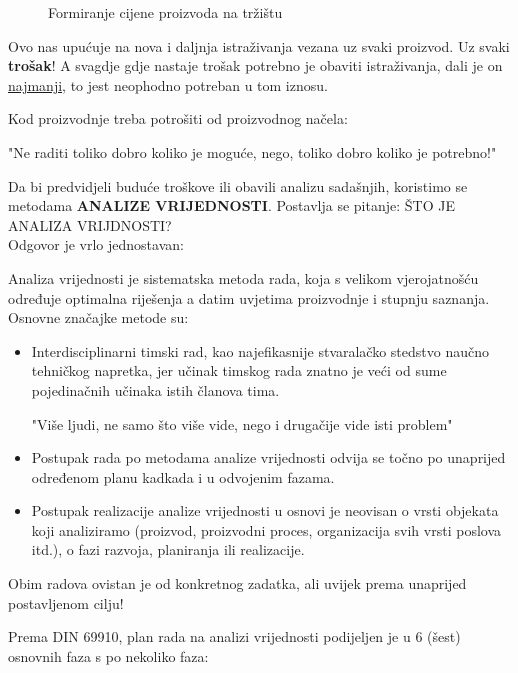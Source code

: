 \documentclass[a4paper,12pt]{article}
\numberwithin{figure}{section}
\begin{document}
\begin{figure}
\centering
 
\caption{Formiranje cijene proizvoda na tržištu}\label{Slika1}
\end{figure}
\FloatBarrier
\par
Ovo nas upućuje na nova i daljnja istraživanja vezana uz svaki proizvod. Uz svaki \textbf{trošak}! A svagdje gdje nastaje trošak potrebno je obaviti istraživanja, dali je on \underline{najmanji}, to jest neophodno potreban u tom iznosu.\par
Kod proizvodnje treba potrošiti od proizvodnog načela:
\begin{center}
"Ne raditi toliko dobro koliko je moguće, nego, toliko dobro koliko je potrebno!"
\end{center}
\par
Da bi predvidjeli buduće troškove ili obavili analizu sadašnjih, koristimo se metodama \textbf{ANALIZE VRIJEDNOSTI}. Postavlja se pitanje: ŠTO JE ANALIZA VRIJDNOSTI?\\
Odgovor je vrlo jednostavan:\par
Analiza vrijednosti je sistematska metoda rada, koja s velikom vjerojatnošću određuje optimalna riješenja a datim uvjetima proizvodnje i stupnju saznanja. \\
Osnovne značajke metode su:
\begin{itemize}
\item Interdisciplinarni timski rad, kao najefikasnije stvaralačko stedstvo naučno tehničkog napretka, jer učinak timskog rada znatno je veći od sume pojedinačnih učinaka istih članova tima.
\begin{center}
"Više ljudi, ne samo što više vide, nego i drugačije vide isti problem"
\end{center}
\item Postupak rada po metodama analize vrijednosti odvija se točno po unaprijed  određenom planu kadkada i u odvojenim fazama.
\item Postupak realizacije analize vrijednosti u osnovi je neovisan o vrsti objekata koji analiziramo (proizvod, proizvodni proces, organizacija svih vrsti poslova itd.), o fazi razvoja, planiranja ili realizacije.
\end{itemize}
\par
Obim radova ovistan je od konkretnog zadatka, ali uvijek prema unaprijed postavljenom cilju!
\par
Prema DIN 69910, plan rada na analizi vrijednosti podijeljen je u 6 (šest) osnovnih faza s po nekoliko faza:
\end{document}
